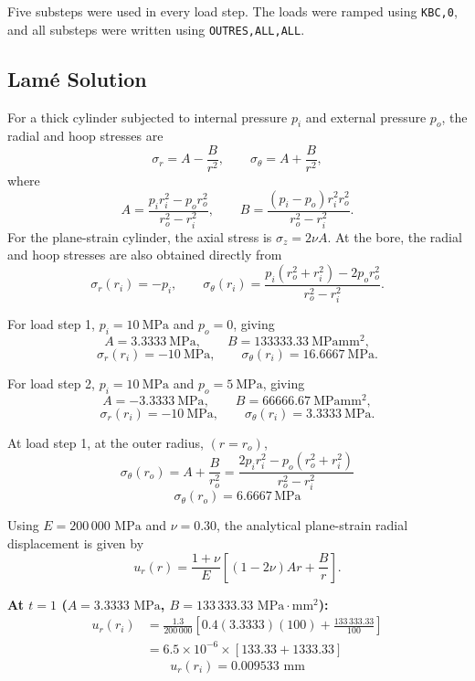 Five substeps were used in every load step.  The loads were ramped using
\texttt{KBC,0}, and all substeps were written using
\texttt{OUTRES,ALL,ALL}.

\subsection{Lam\'e Solution}

For a thick cylinder subjected to internal pressure $p_i$ and external
pressure $p_o$, the radial and hoop stresses are
\[
\sigma_r=A-\frac{B}{r^2},\qquad
\sigma_\theta=A+\frac{B}{r^2},
\]
where
\[
A=\frac{p_i r_i^2-p_o r_o^2}{r_o^2-r_i^2},
\qquad
B=\frac{(p_i-p_o)r_i^2r_o^2}{r_o^2-r_i^2}.
\]
For the plane-strain cylinder, the axial stress is $\sigma_z=2\nu A$.
At the bore, the radial and hoop stresses are also obtained directly from
\[
\sigma_r(r_i)=-p_i,\qquad
\sigma_\theta(r_i)=
\frac{p_i(r_o^2+r_i^2)-2p_o r_o^2}{r_o^2-r_i^2}.
\]

For load step 1, $p_i=\SI{10}{\mega\pascal}$ and $p_o=0$, giving
\[
A=\SI{3.3333}{\mega\pascal},\qquad
B=\SI{133333.33}{\mega\pascal\milli\metre^2},
\]
\[
\boxed{
\sigma_r(r_i)=-\SI{10}{\mega\pascal},\qquad
\sigma_\theta(r_i)=\SI{16.6667}{\mega\pascal}.}
\]

For load step 2, $p_i=\SI{10}{\mega\pascal}$ and
$p_o=\SI{5}{\mega\pascal}$, giving
\[
A=-\SI{3.3333}{\mega\pascal},\qquad B=\SI{66666.67}{\mega\pascal\milli\metre^2},
\]
\[
\boxed{
\sigma_r(r_i)=-\SI{10}{\mega\pascal},\qquad
\sigma_\theta(r_i)=\SI{3.3333}{\mega\pascal}.}
\]

At load step 1, at the outer radius, $(r = r_o)$, 
\[
\sigma_\theta(r_o) = A + \frac{B}{r_o^2} = \frac{2 p_i r_i^2 - p_o (r_o^2 + r_i^2)}{r_o^2 - r_i^2}
\]
\[
\boxed{\sigma_\theta(r_o) = 6.6667\,\text{MPa}}
\]

Using $E = 200\,000\text{ MPa}$ and $\nu = 0.30$, the analytical plane-strain radial displacement is given by
\begin{equation}
u_r(r) = \frac{1 + \nu}{E} \left[ (1 - 2\nu)Ar + \frac{B}{r} \right].
\end{equation}

\textbf{At $t = 1$ ($A = 3.3333\text{ MPa}$, $B = 133\,333.33\text{ MPa}\cdot\text{mm}^2$):}
    \begin{align*}
    u_r(r_i) &= \frac{1.3}{200\,000} \left[ 0.4(3.3333)(100) + \frac{133\,333.33}{100} \right] \\
             &= 6.5 \times 10^{-6} \times [133.33 + 1333.33] 
    \end{align*}
    \[\boxed{u_r(r_i)  = {0.009533\text{ mm}}}
    \]


